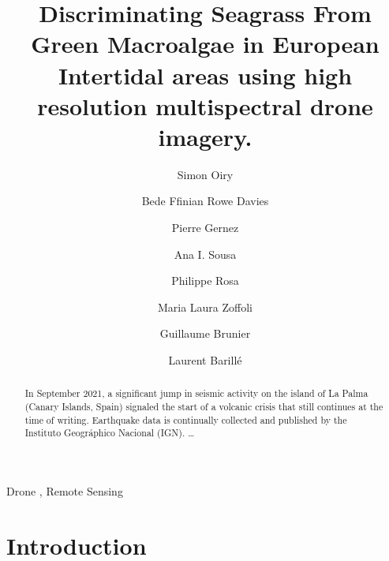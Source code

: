 \documentclass[
  number]{elsarticle}
\begin{document}
\begin{frontmatter}
\title{Discriminating Seagrass From Green Macroalgae in European
Intertidal areas using high resolution multispectral drone imagery.}
\author[1]{Simon Oiry%
%
}
\author[1]{Bede Ffinian Rowe Davies%
%
}

\author[1]{Pierre Gernez%
%
}

\author[2]{Ana I. Sousa%
%
}

\author[1]{Philippe Rosa%
%
}

\author[3]{Maria Laura Zoffoli%
%
}

\author[4]{Guillaume Brunier%
%
}

\author[1]{Laurent Barillé%
%
}











        
\begin{abstract}
In September 2021, a significant jump in seismic activity on the island
of La Palma (Canary Islands, Spain) signaled the start of a volcanic
crisis that still continues at the time of writing. Earthquake data is
continually collected and published by the Instituto Geográphico
Nacional (IGN). \ldots{}
\end{abstract}





\begin{keyword}
    Drone \sep 
    Remote Sensing
\end{keyword}
\end{frontmatter}
    
\section{Introduction}\label{introduction}
\end{document}
